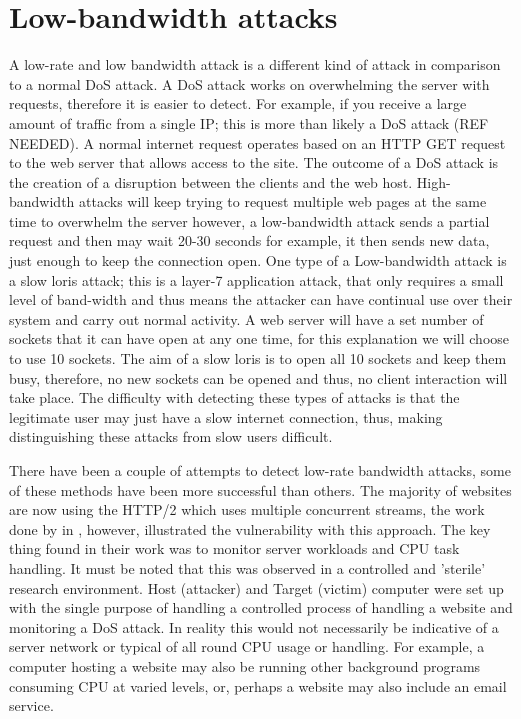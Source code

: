 
\section{Low-bandwidth attacks} \label{attack1}

A low-rate and low bandwidth attack is a different kind of attack in comparison to a normal DoS attack. A DoS attack works on overwhelming the server with requests, therefore it is easier to detect. For example, if you receive a large amount of traffic from a single IP; this is more than likely a DoS attack (REF NEEDED). A normal internet request operates based on an HTTP GET request to the web server that allows access to the site. The outcome of a DoS attack is the creation of a disruption between the clients and the web host. High-bandwidth attacks will keep trying to request multiple web pages at the same time to overwhelm the server however, a low-bandwidth attack sends a partial request and then may wait 20-30 seconds for example, it then sends new data, just enough to keep the connection open. One type of a Low-bandwidth attack is a slow loris attack; this is a layer-7 application attack, that only requires a small level of band-width and thus means the attacker can have continual use over their system and carry out normal activity. A web server will have a set number of sockets that it can have open at any one time, for this explanation we will choose to use 10 sockets. The aim of a slow loris is to open all 10 sockets and keep them busy, therefore, no new sockets can be opened and thus, no client interaction will take place. The difficulty with detecting these types of attacks is that the legitimate user may just have a slow internet connection, thus, making distinguishing these attacks from slow users difficult. 

There have been a couple of attempts to detect low-rate bandwidth attacks, some of these methods have been more successful than others.  The majority of websites are now using the HTTP/2 which uses multiple concurrent streams, the work done by \citeauthor{lowRateh2} in \citeyear{lowRateh2}, however, illustrated the vulnerability with this approach. The key thing found in their work was to monitor server workloads and CPU task handling. It must be noted that this was observed in a controlled and 'sterile' research environment. Host (attacker) and Target (victim) computer were set up with the single purpose of handling a controlled process of handling a website and monitoring a DoS attack. In reality this would not necessarily be indicative of a server network or typical of all round CPU usage or handling. For example, a computer hosting a website may also be running other background programs consuming CPU at varied levels, or, perhaps a website may also include an email service. 

